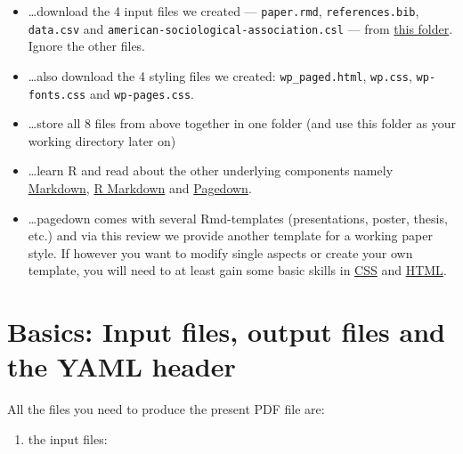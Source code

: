 \documentclass[
  letterpaper,
  DIV=11,
  numbers=noendperiod]{scrartcl}
\providecommand{\tightlist}{%
  \setlength{\itemsep}{0pt}\setlength{\parskip}{0pt}}\usepackage{longtable,booktabs,array}
\begin{document}
\begin{itemize}
\tightlist
\item
  \ldots download the 4 input files we created --- \texttt{paper.rmd},
  \texttt{references.bib}, \texttt{data.csv} and
  \texttt{american-sociological-association.csl} --- from
  \href{https://drive.google.com/drive/folders/1rWzj-Bu1EKqkSuE1gaFzduBJhzlThpkw?usp=sharing}{this
  folder}. Ignore the other files.
\item
  \ldots also download the 4 styling files we created:
  \texttt{wp\_paged.html}, \texttt{wp.css}, \texttt{wp-fonts.css} and
  \texttt{wp-pages.css}.
\item
  \ldots store all 8 files from above together in one folder (and use
  this folder as your working directory later on)
\item
  \ldots learn R and read about the other underlying components namely
  \href{https://en.wikipedia.org/wiki/Markdown}{Markdown},
  \href{https://rmarkdown.rstudio.com/lesson-1.html}{R Markdown} and
  \href{https://pagedown.rbind.io/}{Pagedown}.
\item
  \ldots pagedown comes with several Rmd-templates (presentations,
  poster, thesis, etc.) and via this review we provide another template
  for a working paper style. If however you want to modify single
  aspects or create your own template, you will need to at least gain
  some basic skills in \href{https://www.w3schools.com/css/}{CSS} and
  \href{https://www.w3schools.com/html/}{HTML}.
\end{itemize}

\hypertarget{basics-input-files-output-files-and-the-yaml-header}{%
\section{Basics: Input files, output files and the YAML
header}\label{basics-input-files-output-files-and-the-yaml-header}}

All the files you need to produce the present PDF file are:

\begin{enumerate}
\def\labelenumi{\arabic{enumi}.}
\tightlist
\item
  the input files:
\end{enumerate}
\end{document}
